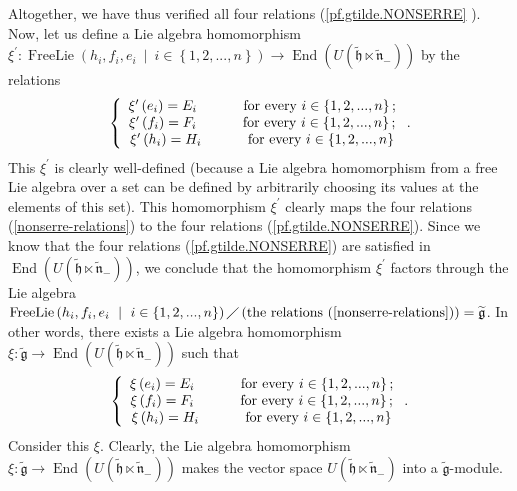 \documentclass[etingof-lie.tex]{subfiles}
\begin{document}
Altogether, we have thus verified all four relations (\ref{pf.gtilde.NONSERRE}%
). Now, let us define a Lie algebra homomorphism $\xi^{\prime}%
:\operatorname*{FreeLie}\left(  h_{i},f_{i},e_{i}\ \mid\ i\in\left\{
1,2,...,n\right\}  \right)  \rightarrow\operatorname*{End}\left(  U\left(
\widetilde{\mathfrak{h}}\ltimes\widetilde{\mathfrak{n}}_{-}\right)  \right)  $
by the relations%
\[
\left\{
\begin{array}
[c]{c}%
\xi^{\prime}\left(  e_{i}\right)  =E_{i}\ \ \ \ \ \ \ \ \ \ \text{for every
}i\in\left\{  1,2,...,n\right\}  ;\\
\xi^{\prime}\left(  f_{i}\right)  =F_{i}\ \ \ \ \ \ \ \ \ \ \text{for every
}i\in\left\{  1,2,...,n\right\}  ;\\
\xi^{\prime}\left(  h_{i}\right)  =H_{i}\ \ \ \ \ \ \ \ \ \ \text{for every
}i\in\left\{  1,2,...,n\right\}
\end{array}
\right.  .
\]
This $\xi^{\prime}$ is clearly well-defined (because a Lie algebra
homomorphism from a free Lie algebra over a set can be defined by arbitrarily
choosing its values at the elements of this set). This homomorphism
$\xi^{\prime}$ clearly maps the four relations (\ref{nonserre-relations}) to
the four relations (\ref{pf.gtilde.NONSERRE}). Since we know that the four
relations (\ref{pf.gtilde.NONSERRE}) are satisfied in $\operatorname*{End}%
\left(  U\left(  \widetilde{\mathfrak{h}}\ltimes\widetilde{\mathfrak{n}}%
_{-}\right)  \right)  $, we conclude that the homomorphism $\xi^{\prime}$
factors through the Lie algebra $\operatorname*{FreeLie}\left(  h_{i}%
,f_{i},e_{i}\ \mid\ i\in\left\{  1,2,...,n\right\}  \right)  \diagup\left(
\text{the relations (\ref{nonserre-relations})}\right)
=\widetilde{\mathfrak{g}}$. In other words, there exists a Lie algebra
homomorphism $\xi:\widetilde{\mathfrak{g}}\rightarrow\operatorname*{End}%
\left(  U\left(  \widetilde{\mathfrak{h}}\ltimes\widetilde{\mathfrak{n}}%
_{-}\right)  \right)  $ such that%
\[
\left\{
\begin{array}
[c]{c}%
\xi\left(  e_{i}\right)  =E_{i}\ \ \ \ \ \ \ \ \ \ \text{for every }%
i\in\left\{  1,2,...,n\right\}  ;\\
\xi\left(  f_{i}\right)  =F_{i}\ \ \ \ \ \ \ \ \ \ \text{for every }%
i\in\left\{  1,2,...,n\right\}  ;\\
\xi\left(  h_{i}\right)  =H_{i}\ \ \ \ \ \ \ \ \ \ \text{for every }%
i\in\left\{  1,2,...,n\right\}
\end{array}
\right.  .
\]
Consider this $\xi$. Clearly, the Lie algebra homomorphism $\xi
:\widetilde{\mathfrak{g}}\rightarrow\operatorname*{End}\left(  U\left(
\widetilde{\mathfrak{h}}\ltimes\widetilde{\mathfrak{n}}_{-}\right)  \right)  $
makes the vector space $U\left(  \widetilde{\mathfrak{h}}\ltimes
\widetilde{\mathfrak{n}}_{-}\right)  $ into a $\widetilde{\mathfrak{g}}$-module.
\end{document}

